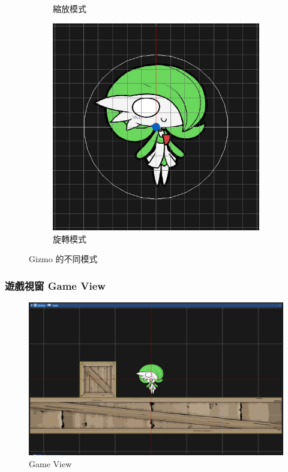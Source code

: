 \begin{figure}[h]
\begin{subfigure}[b]{0.25\linewidth}
        \caption{縮放模式}
    \end{subfigure}
    \begin{subfigure}[b]{0.5\linewidth}
        \includegraphics[width=\linewidth]{./resources/editor/gizmo_d.png}
        \caption{旋轉模式}
    \end{subfigure}
\caption{Gizmo 的不同模式}
\label{fig:Gizmo}
\end{figure}

\subsubsection{遊戲視窗 Game View}

\begin{figure}[h]
    \begin{center}
    \includegraphics[width=\linewidth]{./resources/editor/sceneView.png}
    \end{center}
\caption{Game View}
\label{gameView}
\end{figure}

